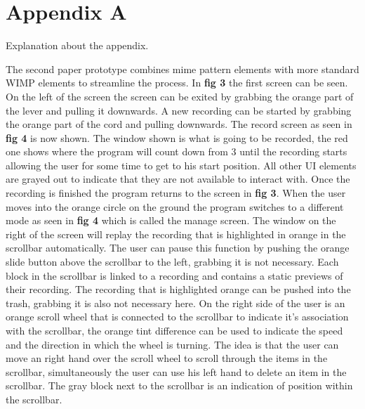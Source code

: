\chapter{Appendix A}
Explanation about the appendix.

The second paper prototype combines mime pattern elements with more standard WIMP elements to streamline the process. In \textbf{ fig 3} the first screen can be seen. On the left of the screen the screen can be exited by grabbing the orange part of the lever and pulling it downwards. A new recording can be started by grabbing the orange part of the cord and pulling downwards. The record screen as seen in \textbf{ fig 4} is now shown. The window shown is what is going to be recorded, the red one shows where the program will count down from 3 until the recording starts allowing the user for some time to get to his start position. All other UI elements are grayed out to indicate that they are not available to interact with. Once the recording is finished the program returns to the screen in \textbf{ fig 3}. When the user moves into the orange circle on the ground the program switches to a different mode as seen in \textbf{ fig 4} which is called the manage screen. The window on the right of the screen will replay the recording that is highlighted in orange in the scrollbar automatically. The user can pause this function by pushing the orange slide button above the scrollbar to the left, grabbing it is not necessary. Each block in the scrollbar is linked to a recording and contains a static previews of their recording. The recording that is highlighted orange can be pushed into the trash, grabbing it is also not necessary here. On the right side of the user is an orange scroll wheel that is connected to the scrollbar to indicate it's association with the scrollbar, the orange tint difference can be used to indicate the speed and the direction in which the wheel is turning. The idea is that the user can move an right hand over the scroll wheel to scroll through the items in the scrollbar, simultaneously the user can use his left hand to delete an item in the scrollbar. The gray block next to the scrollbar is an indication of position within the scrollbar.

